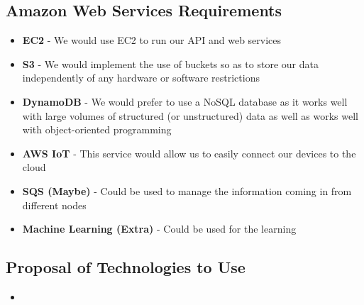 \documentclass{article}
\begin{document}
	\subsection{Amazon Web Services Requirements}
		\begin{itemize}
			\item \textbf{EC2} - We would use EC2 to run our API and web services
			\item \textbf{S3} - We would implement the use of buckets so as to store our data independently of any hardware or software restrictions
			\item \textbf{DynamoDB} - We would prefer to use a NoSQL database as it works well with large volumes of structured (or unstructured) data as well as works well with object-oriented programming
			\item \textbf{AWS IoT} - This service would allow us to easily connect our devices to the cloud
			\item \textbf{SQS (Maybe)} - Could be used to manage the information coming in from different nodes
			\item \textbf{Machine Learning (Extra)} - Could be used for the learning
		\end{itemize}
	\subsection{Proposal of Technologies to Use}
		\begin{itemize}
			\item
		\end{itemize}
\end{document}
